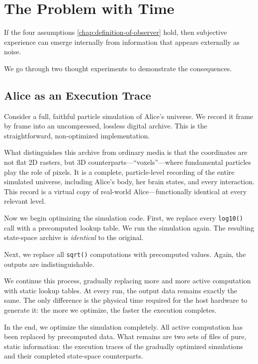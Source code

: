 \section{The Problem with Time}
\label{sect:the-problem-with-time}

If the four assumptions \ref{chap:definition-of-observer} hold, then subjective experience can emerge internally from information that appears externally as noise.

We go through two thought experiments to demonstrate the consequences.


\subsection*{Alice as an Execution Trace}

Consider a full, faithful particle simulation of Alice's universe. 
We record it frame by frame into an uncompressed, lossless digital archive. 
This is the straightforward, non-optimized implementation.

What distinguishes this archive from ordinary media is that the coordinates are not flat 2D rasters,
but 3D counterparts---``voxels''---where fundamental particles play the role of pixels. 
It is a complete, particle-level recording of the entire simulated universe, including Alice's body, her brain states, and every interaction. 
This record is a virtual copy of real-world Alice---functionally identical at every relevant level.

Now we begin optimizing the simulation code. 
First, we replace every \texttt{log10()} call with a precomputed lookup table. 
We run the simulation again. The resulting state-space archive is \emph{identical} to the original.

Next, we replace all \texttt{sqrt()} computations with precomputed values. 
Again, the outputs are indistinguishable.

We continue this process, gradually replacing more and more active computation with static lookup tables. 
At every run, the output data remains exactly the same. The only difference is the physical time required
for the host hardware to generate it: the more we optimize, the faster the execution completes.

In the end, we optimize the simulation completely. 
All active computation has been replaced by precomputed data. What remains are two sets of files of pure, static information: the execution traces of the gradually optimized simulations and their completed state-space counterparts.

